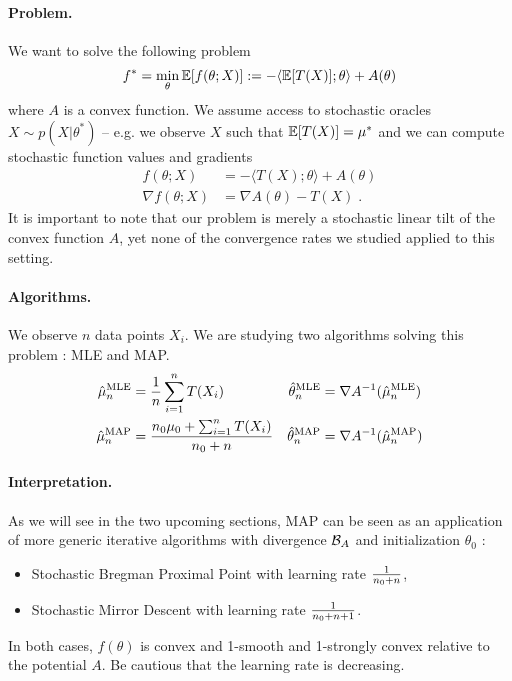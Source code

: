 \documentclass{article}
\newcommand{\logpart}{A}
\newcommand{\bregman}{\cB_\logpart}
\newcommand{\nat}{\theta}
\newcommand{\MAPm}{\hat \mu_n}
\newcommand{\MAPt}{\hat \nat_n}
\begin{document}
\paragraph{Problem.}
We want  to solve the following problem
\begin{align}
	f^* = \min_\nat \E[f(\nat ; X)] := -\langle \E[T(X)] ; \nat \rangle + \logpart(\nat)
\end{align}
where $\logpart$ is a convex function.
We assume access to stochastic oracles $X \sim p(X | \nat^*)$ -- e.g. we observe $X$ such that $\operatorname{\mathbb{E}}[T(X)] = \mu^*$ and we can compute  stochastic function values and gradients 
\begin{align}
	f(\nat ; X) &= -\langle T(X) ; \nat \rangle + \logpart(\nat) \\
	\nabla f(\nat ; X) &= \nabla \logpart(\nat) - T(X)\; .
\end{align}
It is important to note that our problem is merely a stochastic linear tilt of the convex function $\logpart$, yet none of the convergence rates we studied applied to this setting.

\paragraph{Algorithms.}
We observe $n$ data points $X_i$. 
We are studying two algorithms solving this problem : MLE and MAP.
\begin{align}
	\MAPm^\text{MLE} &= \inv{n}\sum_{i=1}^n T(X_i) 
	&\MAPt^\text{MLE} &= \nabla\logpart^{-1}(\MAPm^\text{MLE}) \\
	\MAPm^\text{MAP} &= \frac{n_0\mu_0 + \smallsum_{i=1}^n T(X_i)}{n_0 + n}
	&\MAPt^\text{MAP} &= \nabla\logpart^{-1}(\MAPm^\text{MAP})	
\end{align}

\paragraph{Interpretation.}
As we will see in the two upcoming sections, MAP can be seen as an application of more generic iterative algorithms with divergence $\bregman$ and initialization $\nat_0$ : 
\begin{itemize}
	\item Stochastic Bregman Proximal Point with learning rate $\frac{1}{n_0+n}$,
	\item Stochastic Mirror Descent with learning rate  $\frac{1}{n_0+n +1}$.
\end{itemize}
In both cases, $f(\nat)$ is convex and 1-smooth  and 1-strongly convex relative to the potential $\logpart$. Be cautious that the learning rate is decreasing.
\end{document}
